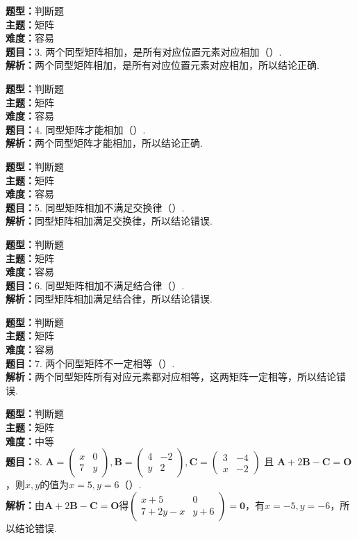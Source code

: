 \documentclass{ctexart}
\newenvironment{question}[5]{%
	\noindent\textbf{题型：}#1\\
	\textbf{主题：}#2\\
	\textbf{难度：}#3\\
	\textbf{题目：}#4\\
	\textbf{解析：}#5\\
	\vspace{1em}
}{}
\begin{document}
	\begin{question}
		{判断题}
		{矩阵}
		{容易}
		{3. 两个同型矩阵相加，是所有对应位置元素对应相加（）.}
		{两个同型矩阵相加，是所有对应位置元素对应相加，所以结论正确.}
	\end{question}
	
	\begin{question}
		{判断题}
		{矩阵}
		{容易}
		{4. 同型矩阵才能相加（）.}
		{两个同型矩阵才能相加，所以结论正确.}
	\end{question}
	
	\begin{question}
		{判断题}
		{矩阵}
		{容易}
		{5. 同型矩阵相加不满足交换律（）.}
		{同型矩阵相加满足交换律，所以结论错误.}
	\end{question}
	
	\begin{question}
		{判断题}
		{矩阵}
		{容易}
		{6. 同型矩阵相加不满足结合律（）.}
		{同型矩阵相加满足结合律，所以结论错误.}
	\end{question}
	
	\begin{question}
		{判断题}
		{矩阵}
		{容易}
		{7. 两个同型矩阵不一定相等（）.}
		{两个同型矩阵所有对应元素都对应相等，这两矩阵一定相等，所以结论错误.}
	\end{question}
	
	\begin{question}
		{判断题}
		{矩阵}
		{中等}
		{8. \(\mathbf{A}=\left(\begin{array}{cc}x & 0 \\ 7 & y\end{array}\right), \mathbf{B}=\left(\begin{array}{cc}4 & -2 \\ y & 2\end{array}\right), \mathbf{C}=\left(\begin{array}{cc}3 & -4 \\ x & -2\end{array}\right)\) 且 \(\mathbf{A}+2\mathbf{B}-\mathbf{C}=\mathbf{O}\)，则\(x, y\)的值为\(x=5, y=6\)（）.}
		{由\(\mathbf{A}+2\mathbf{B}-\mathbf{C}=\mathbf{O}\)得\(\left(\begin{array}{cc}x+5 & 0 \\ 7+2y-x & y+6\end{array}\right)=\mathbf{0}\)，有\(x=-5, y=-6\)，所以结论错误.}
	\end{question}
	
\end{document}
